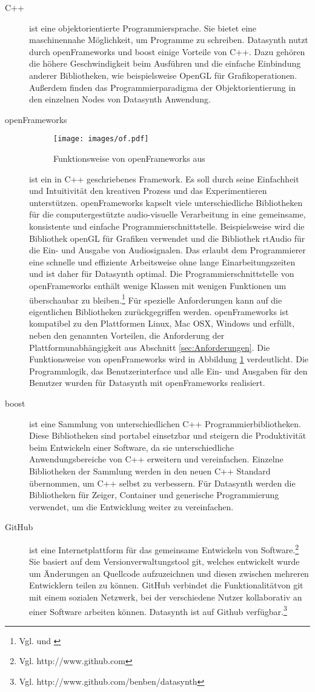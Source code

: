 \documentclass[a4paper, 12pt, DIV=calc, version=first, pdftex, headsepline, footsepline, bibtotocnumbered, liststotocnumbered]{scrreprt}
\begin{document}
\begin{description}
\item[C++]
ist eine objektorientierte Programmiersprache. Sie bietet
eine maschinennahe Möglichkeit, um Programme zu schreiben.
Datasynth nutzt durch openFrameworks und boost einige Vorteile
von C++. Dazu gehören die höhere Geschwindigkeit beim Ausführen
und die einfache Einbindung anderer Bibliotheken, wie 
beispielsweise OpenGL für Grafikoperationen. Außerdem
finden das Programmierparadigma der Objektorientierung
in den einzelnen Nodes von Datasynth Anwendung.
\item[openFrameworks]
\begin{figure}
\centering
\texttt{[image: images/of.pdf]}
\caption{Funktionsweise von openFrameworks aus \citep{of_wiki}}
\label{fig:of}
\end{figure}
ist ein in C++ geschriebenes Framework. Es soll durch seine
Einfachheit und Intuitivität den kreativen Prozess und das
Experimentieren unterstützen. openFrameworks
kapselt viele unterschiedliche Bibliotheken für die
computergestützte audio-visuelle Verarbeitung in eine gemeinsame,
konsistente und einfache Programmierschnittstelle. Beispielsweise
wird die Bibliothek openGL für Grafiken verwendet und die
Bibliothek rtAudio für die Ein- und Ausgabe von Audiosignalen.
Das erlaubt dem Programmierer eine schnelle und effiziente Arbeitsweise ohne
lange Einarbeitungszeiten und ist daher für Datasynth optimal.
Die Programmierschnittstelle von openFrameworks enthält
wenige Klassen mit wenigen Funktionen um überschaubar zu bleiben.\footnote{Vgl. \citep{of1} und \citep{of2}}
Für spezielle Anforderungen kann auf die eigentlichen Bibliotheken
zurückgegriffen werden.
openFrameworks ist kompatibel zu den Plattformen
Linux, Mac OSX, Windows und erfüllt, neben den genannten Vorteilen,
die Anforderung der Plattformunabhängigkeit aus Abschnitt \ref{sec:Anforderungen}.
Die Funktionsweise von openFrameworks wird in Abbildung
\ref{fig:of} verdeutlicht. 
Die Programmlogik, das Benutzerinterface und alle Ein- und
Ausgaben für den Benutzer wurden für Datasynth mit openFrameworks
realisiert.
\item[boost]
ist eine Sammlung von unterschiedlichen C++ Programmierbibliotheken.
Diese Bibliotheken sind portabel einsetzbar und steigern die
Produktivität beim Entwickeln einer Software, da sie unterschiedliche
Anwendungsbereiche von C++ erweitern und vereinfachen.
Einzelne Bibliotheken der Sammlung werden in den neuen C++ Standard
übernommen, um C++ selbst zu verbessern.
Für Datasynth werden die Bibliotheken für Zeiger, Container
und generische Programmierung verwendet, um die Entwicklung weiter zu vereinfachen.
\item[GitHub]
ist eine Internetplattform für das gemeinsame Entwickeln von Software.\footnote{Vgl. http://www.github.com}
Sie basiert auf dem Versionverwaltungstool git, welches entwickelt wurde
um Änderungen an Quellcode aufzuzeichnen und diesen zwischen mehreren
Entwicklern teilen zu können. GitHub verbindet die Funktionalitätvon git mit
einem sozialen Netzwerk, bei der verschiedene Nutzer kollaborativ
an einer Software arbeiten können. Datasynth ist auf Github verfügbar.\footnote{Vgl. http://www.github.com/benben/datasynth}
\end{description}
\end{document}
